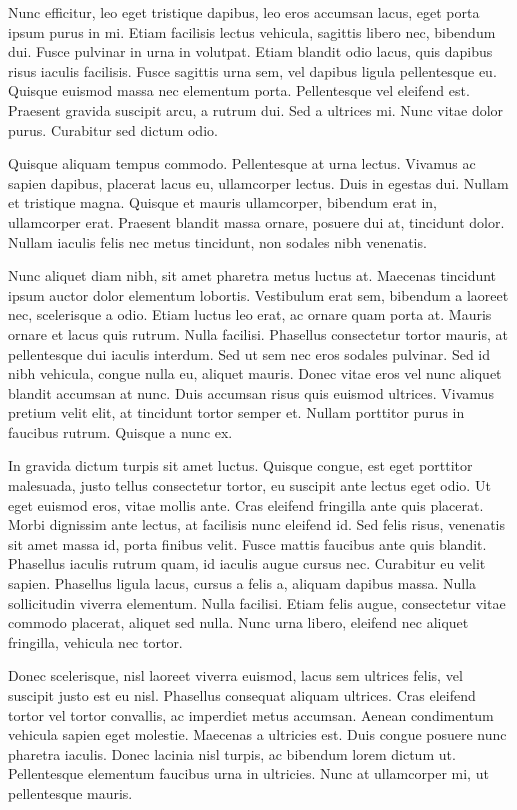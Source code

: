 \documentclass{article}
\begin{document}
Nunc efficitur, leo eget tristique dapibus, leo eros accumsan lacus, eget porta ipsum purus in mi. Etiam facilisis lectus vehicula, sagittis libero nec, bibendum dui. Fusce pulvinar in urna in volutpat. Etiam blandit odio lacus, quis dapibus risus iaculis facilisis. Fusce sagittis urna sem, vel dapibus ligula pellentesque eu. Quisque euismod massa nec elementum porta. Pellentesque vel eleifend est. Praesent gravida suscipit arcu, a rutrum dui. Sed a ultrices mi. Nunc vitae dolor purus. Curabitur sed dictum odio.

Quisque aliquam tempus commodo. Pellentesque at urna lectus. Vivamus ac sapien dapibus, placerat lacus eu, ullamcorper lectus. Duis in egestas dui. Nullam et tristique magna. Quisque et mauris ullamcorper, bibendum erat in, ullamcorper erat. Praesent blandit massa ornare, posuere dui at, tincidunt dolor. Nullam iaculis felis nec metus tincidunt, non sodales nibh venenatis.

Nunc aliquet diam nibh, sit amet pharetra metus luctus at. Maecenas tincidunt ipsum auctor dolor elementum lobortis. Vestibulum erat sem, bibendum a laoreet nec, scelerisque a odio. Etiam luctus leo erat, ac ornare quam porta at. Mauris ornare et lacus quis rutrum. Nulla facilisi. Phasellus consectetur tortor mauris, at pellentesque dui iaculis interdum. Sed ut sem nec eros sodales pulvinar. Sed id nibh vehicula, congue nulla eu, aliquet mauris. Donec vitae eros vel nunc aliquet blandit accumsan at nunc. Duis accumsan risus quis euismod ultrices. Vivamus pretium velit elit, at tincidunt tortor semper et. Nullam porttitor purus in faucibus rutrum. Quisque a nunc ex.

In gravida dictum turpis sit amet luctus. Quisque congue, est eget porttitor malesuada, justo tellus consectetur tortor, eu suscipit ante lectus eget odio. Ut eget euismod eros, vitae mollis ante. Cras eleifend fringilla ante quis placerat. Morbi dignissim ante lectus, at facilisis nunc eleifend id. Sed felis risus, venenatis sit amet massa id, porta finibus velit. Fusce mattis faucibus ante quis blandit. Phasellus iaculis rutrum quam, id iaculis augue cursus nec. Curabitur eu velit sapien. Phasellus ligula lacus, cursus a felis a, aliquam dapibus massa. Nulla sollicitudin viverra elementum. Nulla facilisi. Etiam felis augue, consectetur vitae commodo placerat, aliquet sed nulla. Nunc urna libero, eleifend nec aliquet fringilla, vehicula nec tortor.

Donec scelerisque, nisl laoreet viverra euismod, lacus sem ultrices felis, vel suscipit justo est eu nisl. Phasellus consequat aliquam ultrices. Cras eleifend tortor vel tortor convallis, ac imperdiet metus accumsan. Aenean condimentum vehicula sapien eget molestie. Maecenas a ultricies est. Duis congue posuere nunc pharetra iaculis. Donec lacinia nisl turpis, ac bibendum lorem dictum ut. Pellentesque elementum faucibus urna in ultricies. Nunc at ullamcorper mi, ut pellentesque mauris.
\end{document}
